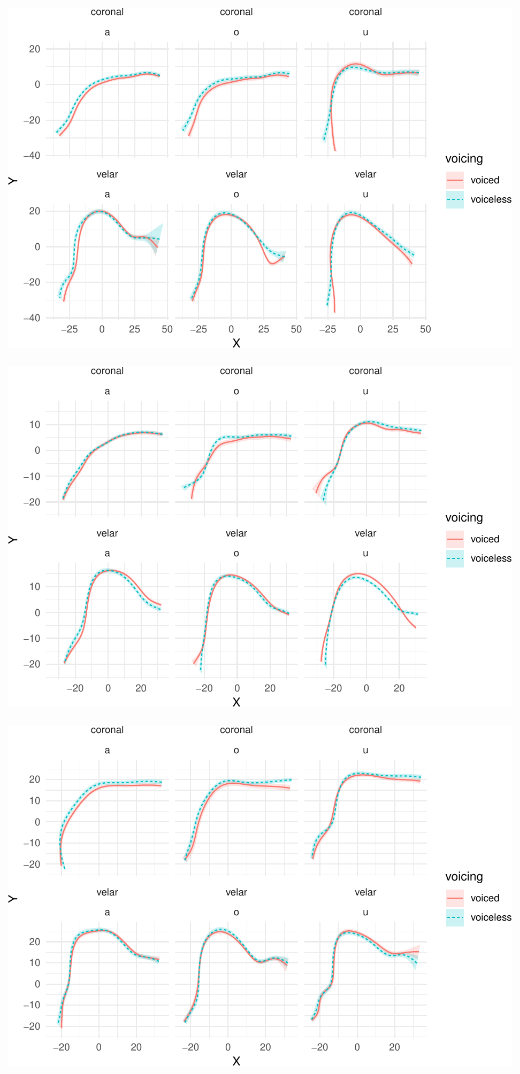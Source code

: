 \documentclass[12pt,]{article}
\begin{document}
\includegraphics{2018-polar-gam_files/figure-latex/unnamed-chunk-2-1.pdf}

\includegraphics{2018-polar-gam_files/figure-latex/unnamed-chunk-3-1.pdf}

\includegraphics{2018-polar-gam_files/figure-latex/unnamed-chunk-4-1.pdf}


\end{document}
